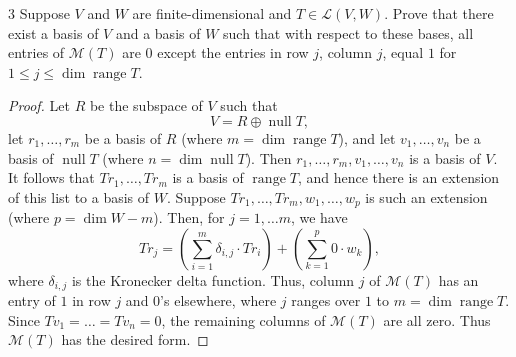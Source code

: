 \documentclass{extarticle}
\newenvironment{problem}[1]{\begin{prob*}{#1}{}}{\end{prob*}}
\newcommand{\mat}{\mathcal{M}}
\newcommand{\Hom}{\mathcal{L}}
\DeclareMathOperator{\Null}{null}
\DeclareMathOperator{\Range}{range}
\begin{document}
\begin{problem}{3}
Suppose $V$ and $W$ are finite-dimensional and $T\in\Hom(V,W)$.  Prove that there exist a basis of $V$ and a basis of $W$ such that with respect to these bases, all entries of $\mat(T)$ are $0$ except the entries in row $j$, column $j$, equal $1$ for $1\leq j\leq \dim\Range T$.  
\end{problem}
\begin{proof}
Let $R$ be the subspace of $V$ such that 
\begin{equation*}
V = R\oplus \Null T,
\end{equation*}
let $r_1,\dots, r_m$ be a basis of $R$ (where $m =\dim\Range T$), and let $v_1,\dots, v_n$ be a basis of $\Null T$ (where $n = \dim\Null T$).  Then $r_1,\dots, r_m, v_1,\dots,v_n$ is a basis of $V$.  It follows that $Tr_1,\dots, Tr_m$ is a basis of $\Range T$, and hence there is an extension of this list to a basis of $W$.  Suppose $Tr_1,\dots, Tr_m, w_1,\dots, w_p$ is such an extension (where $p = \dim W - m$).  Then, for $j = 1,\dots m$, we have
\begin{equation*}
Tr_j = \left(\sum_{i = 1}^m\delta_{i,j}\cdot Tr_i\right) + \left(\sum_{k = 1}^p 0\cdot w_k\right),
\end{equation*}
where $\delta_{i,j}$ is the Kronecker delta function.  Thus, column $j$ of $\mat(T)$ has an entry of $1$ in row $j$ and $0$'s elsewhere, where $j$ ranges over $1$ to $m = \dim\Range T$.  Since $Tv_1 = \dots = Tv_n = 0$, the remaining columns of $\mat(T)$ are all zero.  Thus $\mat(T)$ has the desired form.
\end{proof}
\end{document}
